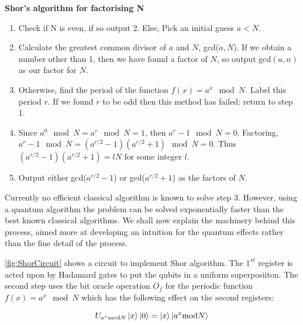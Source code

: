 \begin{tcolorbox}[standard jigsaw,
    opacityback=0,  %
    boxrule=0.5pt,label={Shor's algorithm box}]
    {\bf Shor's algorithm for factorising N}
    \tcbline
    \begin{enumerate}
    \item Check if N is even, if so output 2. Else, Pick an initial guess $a<N$.
    \item Calculate the greatest common divisor of $a$ and $N$, gcd($a,N$). If we obtain a number other than 1, then we have found a factor of $N$, so output gcd$(a,n)$ as our factor for $N$.
    \item Otherwise, find the period of the function $f(x) = a^x \mod N$. Label this period $r$. If we found $r$ to be odd then this method has failed: return to step 1. 
    \item Since  $a^0 \mod N = a^r \mod N = 1$, then $a^r - 1 \mod N = 0$. Factoring, $a^r-1 \mod N = (a^{r/2} - 1)(a^{r/2} + 1) \mod N = 0$. Thus $(a^{r/2} - 1)(a^{r/2} + 1) = lN$ for some integer $l$. 
    \item Output either gcd($a^{r/2}-1$) or gcd($a^{r/2}+1$) as the factors of $N$.
    \end{enumerate}
\end{tcolorbox}

Currently no efficient classical algorithm is known to solve step 3. However, using a quantum algorithm the problem can be solved exponentially faster than the best known classical algorithms. We shall now explain the machinery behind this process, aimed more at developing an intuition for the quantum effects rather than the fine detail of the process.

\autoref{fig:ShorCircuit} shows a circuit to implement Shor algorithm. The $1^{st}$ register is acted upon by Hadamard gates to put the qubits in a uniform superposiiton. The second step uses the bit oracle operation $O_f$ for the periodic function $f(x)=a^x \mod N$ which has the following effect on the second registers:

\begin{equation}
    U_{a^x \mathrm{mod} N}\left\vert{x}\right\rangle\left\vert{0}\right\rangle= \left\vert{x}\right\rangle\left\vert{a^x \mathrm{mod} N}\right\rangle
\end{equation}



